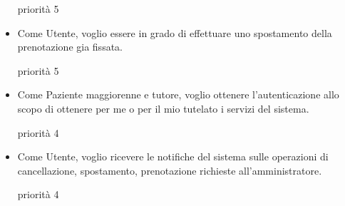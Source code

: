 \begin{itemize}
\medskip priorità 5
\bigskip

\item Come Utente, voglio essere in grado di effettuare uno spostamento della
prenotazione gia fissata.


\medskip priorità 5
\bigskip

\item Come Paziente maggiorenne e tutore, voglio ottenere l'autenticazione
allo scopo di ottenere per me o per il mio tutelato i servizi del sistema.

\medskip priorità 4
\bigskip

\item Come Utente, voglio ricevere le notifiche del sistema sulle operazioni di
cancellazione, spostamento, prenotazione richieste all'amministratore.

\medskip priorità 4
\end{itemize}
